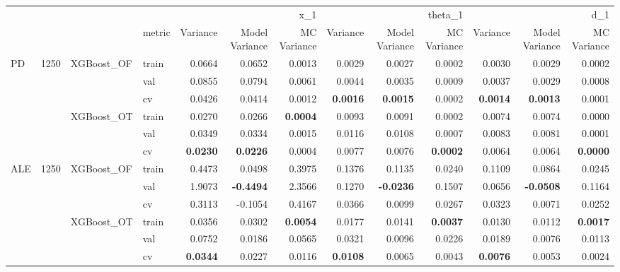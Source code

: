 \begin{tabular}{llllrrrrrrrrr}
 &  &  &  & \multicolumn{3}{r}{x_1} & \multicolumn{3}{r}{theta_1} & \multicolumn{3}{r}{d_1} \\
 &  &  & metric & Variance & Model Variance & MC Variance & Variance & Model Variance & MC Variance & Variance & Model Variance & MC Variance \\
\multirow[c]{6}{*}{PD} & \multirow[c]{6}{*}{1250} & \multirow[c]{3}{*}{XGBoost_OF} & train & 0.0664 & 0.0652 & 0.0013 & 0.0029 & 0.0027 & 0.0002 & 0.0030 & 0.0029 & 0.0002 \\
 &  &  & val & 0.0855 & 0.0794 & 0.0061 & 0.0044 & 0.0035 & 0.0009 & 0.0037 & 0.0029 & 0.0008 \\
 &  &  & cv & 0.0426 & 0.0414 & 0.0012 & \bfseries 0.0016 & \bfseries 0.0015 & 0.0002 & \bfseries 0.0014 & \bfseries 0.0013 & 0.0001 \\
 &  & \multirow[c]{3}{*}{XGBoost_OT} & train & 0.0270 & 0.0266 & \bfseries 0.0004 & 0.0093 & 0.0091 & 0.0002 & 0.0074 & 0.0074 & 0.0000 \\
 &  &  & val & 0.0349 & 0.0334 & 0.0015 & 0.0116 & 0.0108 & 0.0007 & 0.0083 & 0.0081 & 0.0001 \\
 &  &  & cv & \bfseries 0.0230 & \bfseries 0.0226 & 0.0004 & 0.0077 & 0.0076 & \bfseries 0.0002 & 0.0064 & 0.0064 & \bfseries 0.0000 \\
\multirow[c]{6}{*}{ALE} & \multirow[c]{6}{*}{1250} & \multirow[c]{3}{*}{XGBoost_OF} & train & 0.4473 & 0.0498 & 0.3975 & 0.1376 & 0.1135 & 0.0240 & 0.1109 & 0.0864 & 0.0245 \\
 &  &  & val & 1.9073 & \bfseries -0.4494 & 2.3566 & 0.1270 & \bfseries -0.0236 & 0.1507 & 0.0656 & \bfseries -0.0508 & 0.1164 \\
 &  &  & cv & 0.3113 & -0.1054 & 0.4167 & 0.0366 & 0.0099 & 0.0267 & 0.0323 & 0.0071 & 0.0252 \\
 &  & \multirow[c]{3}{*}{XGBoost_OT} & train & 0.0356 & 0.0302 & \bfseries 0.0054 & 0.0177 & 0.0141 & \bfseries 0.0037 & 0.0130 & 0.0112 & \bfseries 0.0017 \\
 &  &  & val & 0.0752 & 0.0186 & 0.0565 & 0.0321 & 0.0096 & 0.0226 & 0.0189 & 0.0076 & 0.0113 \\
 &  &  & cv & \bfseries 0.0344 & 0.0227 & 0.0116 & \bfseries 0.0108 & 0.0065 & 0.0043 & \bfseries 0.0076 & 0.0053 & 0.0024 \\
\end{tabular}
